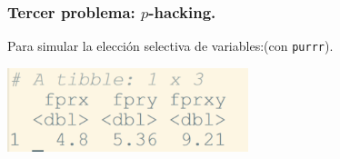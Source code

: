\documentclass[9pt]{beamer}
\begin{document}
\begin{frame}
  \frametitle{Tercer problema: $p$-hacking.}
  \begin{overlayarea}{\textwidth}{\textheight}
  Para simular la elección selectiva de variables:\alert{(con
    {\tt purrr})}.\\
  \begin{center}
  \includegraphics[width=7cm]{images/resultados_seleccion_variable}    
  \end{center}

\end{overlayarea}
\end{frame}
\end{document}
